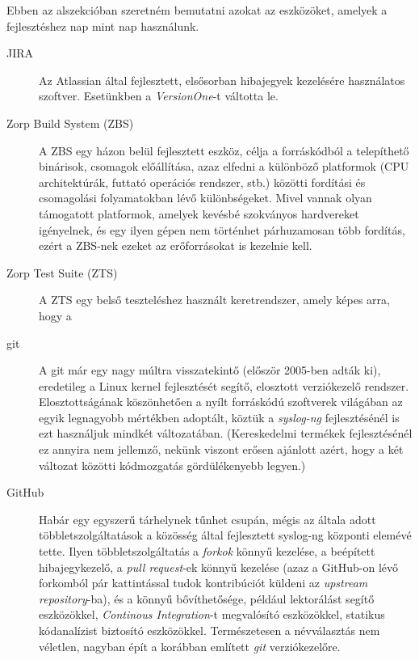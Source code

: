Ebben az alszekcióban szeretném bemutatni azokat az eszközöket, amelyek a fejlesztéshez nap mint nap
használunk.

\begin{description}
    \item[JIRA] {Az Atlassian által fejlesztett, elsősorban hibajegyek kezelésére használatos
        szoftver. Esetünkben a \emph{VersionOne}-t váltotta le.}
    \item[Zorp Build System (ZBS)] {A ZBS egy házon belül fejlesztett eszköz, célja a forráskódból
        a telepíthető binárisok, csomagok előállítása, azaz elfedni a különböző platformok (CPU
        architektúrák, futtató operációs rendszer, stb.) közötti fordítási és csomagolási
        folyamatokban lévő különbségeket. Mivel vannak olyan támogatott platformok, amelyek
        kevésbé szokványos hardvereket igényelnek, és egy ilyen gépen nem történhet párhuzamosan
        több fordítás, ezért a ZBS-nek ezeket az erőforrásokat is kezelnie kell. }
    \item[Zorp Test Suite (ZTS)] { A ZTS egy belső teszteléshez használt keretrendszer, amely
        képes arra, hogy a}
    \item[git] {A git már egy nagy múltra visszatekintő (először 2005-ben adták ki), eredetileg a
        Linux kernel fejlesztését segítő, elosztott verziókezelő rendszer. Elosztottságának
        köszönhetően a nyílt forráskódú szoftverek világában az egyik legnagyobb mértékben
        adoptált, köztük a \emph{syslog-ng} fejlesztésénél is ezt használjuk mindkét változatában.
        (Kereskedelmi termékek fejlesztésénél ez annyira nem jellemző, nekünk viszont erősen
        ajánlott azért, hogy a két változat közötti kódmozgatás gördülékenyebb legyen.)}
    \item[GitHub] {Habár egy egyszerű tárhelynek tűnhet csupán, mégis az általa adott
        többletszolgáltatások a közösség által fejlesztett syslog-ng központi elemévé tette.
        Ilyen többletszolgáltatás a \emph{forkok} könnyű kezelése, a beépített hibajegykezelő,
        a \emph{pull request}-ek könnyű kezelése (azaz a GitHub-on lévő forkomból pár
        kattintással tudok kontribúciót küldeni az \emph{upstream repository}-ba), és a könnyű
        bővíthetősége, például lektorálást segítő eszközökkel, \emph{Continous Integration}-t
        megvalósító eszközökkel, statikus kódanalízist biztosító eszközökkel.
        Természetesen a névválasztás nem véletlen, nagyban épít a korábban említett \emph{git}
        verziókezelőre.}
\end{description}

